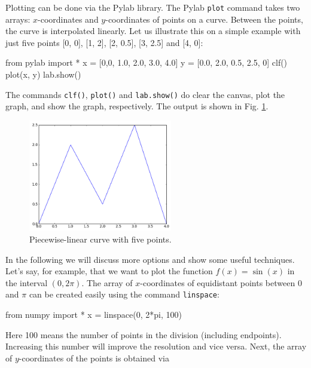 Plotting can be done via the Pylab library. The Pylab {\tt plot} command takes two
arrays: $x$-coordinates and $y$-coordinates of points on a curve. Between the 
points, the curve is interpolated linearly. Let us illustrate this on a simple 
example with just five points [0, 0], [1, 2], [2, 0.5], [3, 2.5] and [4, 0]:

\begin{bluecode}
from pylab import *
x = [0,0, 1.0, 2.0, 3.0, 4.0]
y = [0.0, 2.0, 0.5, 2.5, 0]
clf()
plot(x, y)
lab.show()
\end{bluecode}
The commands {\tt clf()}, {\tt plot()} and {\tt lab.show()} do clear the canvas, 
plot the graph, and show the graph, respectively.
The output is shown in Fig. \ref{fig:plot}.


\begin{figure}[!ht]
\begin{center}
\hbox{}
\hspace{-6mm}
\includegraphics[width=0.56\textwidth]{imgp/plot.png}
\end{center}
\vspace{-2mm}
\caption{Piecewise-linear curve with five points.}
\label{fig:plot}
\end{figure}
\noindent
In the following we will discuss more options and show some useful techniques.
Let's say, for example, that we want to plot the function $f(x) = \sin(x)$
in the interval $(0, 2\pi)$. The array of $x$-coordinates of equidistant points 
between 0 and $\pi$ can be created easily using the command {\tt linspace}:

\begin{bluecode}
from numpy import *
x = linspace(0, 2*pi, 100)
\end{bluecode}
Here 100 means the number of points in the division (including endpoints).
Increasing this number will improve the resolution and vice versa. 
Next, the array of $y$-coordinates of the points is obtained via

